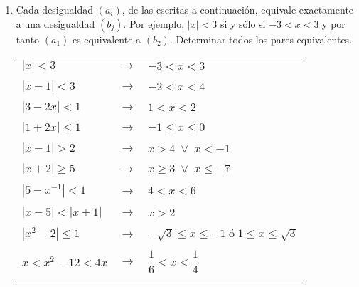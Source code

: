 \begin{enumerate}
\item Cada desigualdad $(a_i)$, de las escritas a continuación, equivale exactamente a una desigualdad $(b_j)$. Por ejemplo, $|x|<3$ si y sólo si $-3<x<3$ y por tanto $(a_1)$ es equivalente a $(b_2)$. Determinar todos los pares equivalentes.\\
\begin{center}
\begin{tabular}{l c l}
$|x|<3$&$\longrightarrow$&$-3<x<3$\\\\
$|x-1|<3$&$\longrightarrow$&$-2<x<4$\\\\
$|3-2x|<1$&$\longrightarrow$&$1<x<2$\\\\
$|1+2x|\leq 1$&$\longrightarrow$&$-1\leq x \leq 0$\\\\
$|x-1|>2$&$\longrightarrow$&$x>4 \; \lor \; x<-1$\\\\
$|x+2| \geq 5$&$\longrightarrow$&$x\geq 3 \; \lor \; x\leq -7$\\\\
$|5-x^{-1}|<1 $&$\longrightarrow$&$4<x<6$\\\\
$|x-5|<|x+1|$&$\longrightarrow$&$x>2$\\\\
$|x^2-2|\leq 1$&$\longrightarrow$&$-\sqrt{3} \leq x \leq -1 \; ó \; 1\leq x \leq \sqrt{3}$\\\\
$x<x^2-12<4x$&$\longrightarrow$&$\dfrac{1}{6}<x<\dfrac{1}{4}$\\\\
\end{tabular}
\end{center}


\end{enumerate}
